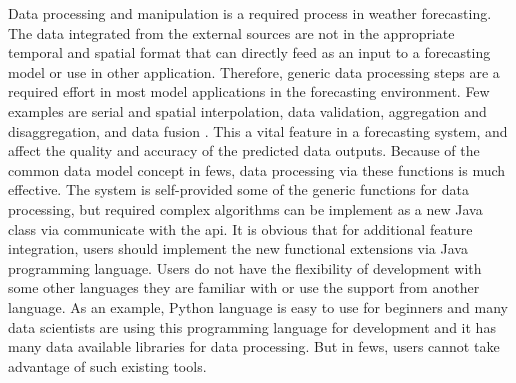 Data processing and manipulation is a required process in weather forecasting. 
The data integrated from the external sources are not in the appropriate temporal and spatial format that can directly feed as an input to a forecasting model or use in other application. Therefore, generic data processing steps are a required effort in most model applications in the forecasting environment. Few examples are serial and spatial interpolation, data validation, aggregation and disaggregation, and data fusion \cite{Werner2013TheSystem}. This a vital feature in a forecasting system, and affect the quality and accuracy of the predicted data outputs. Because of the common data model concept in \acrshort{fews}, data processing via these functions is much effective. The system is self-provided some of the generic functions for data processing, but required complex algorithms can be implement as a new Java class via communicate with the \acrfull{api}. It is obvious that for additional feature integration, users should implement the new functional extensions via Java programming language. Users do not have the flexibility of development with some other languages they are familiar with or use the support from another language. As an example, Python language is easy to use for beginners and many data scientists are using this programming language for development and it has many data available libraries for data processing. But in \acrshort{fews}, users cannot take advantage of such existing tools.

